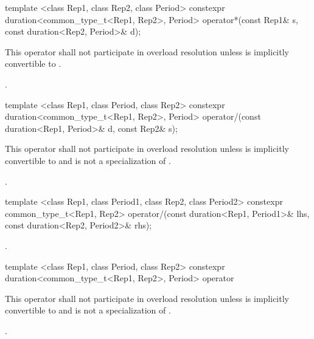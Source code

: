 %
\begin{itemdecl}
template <class Rep1, class Rep2, class Period>
  constexpr duration<common_type_t<Rep1, Rep2>, Period>
  operator*(const Rep1& s, const duration<Rep2, Period>& d);
\end{itemdecl}

\begin{itemdescr}
\pnum
\remarks This operator shall not participate in overload
resolution unless  is implicitly convertible to .

\pnum
\returns {}.
\end{itemdescr}

%
\begin{itemdecl}
template <class Rep1, class Period, class Rep2>
  constexpr duration<common_type_t<Rep1, Rep2>, Period>
  operator/(const duration<Rep1, Period>& d, const Rep2& s);
\end{itemdecl}

\begin{itemdescr}
\pnum
\remarks This operator shall not participate in overload
resolution unless  is implicitly convertible to 
and  is not a specialization of .

\pnum
\returns {}.
\end{itemdescr}

%
\begin{itemdecl}
template <class Rep1, class Period1, class Rep2, class Period2>
  constexpr common_type_t<Rep1, Rep2>
  operator/(const duration<Rep1, Period1>& lhs, const duration<Rep2, Period2>& rhs);
\end{itemdecl}

\begin{itemdescr}
\pnum
\returns {}.
\end{itemdescr}

%
\begin{itemdecl}
template <class Rep1, class Period, class Rep2>
  constexpr duration<common_type_t<Rep1, Rep2>, Period>
  operator%
\end{itemdecl}

\begin{itemdescr}
\pnum
\remarks This operator shall not participate in overload
resolution unless  is implicitly convertible to  and
 is not a specialization of .

\pnum
\returns {}.
\end{itemdescr}

